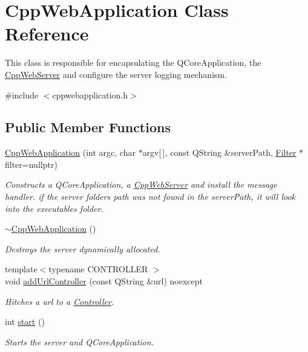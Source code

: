 \hypertarget{class_cpp_web_application}{}\section{Cpp\+Web\+Application Class Reference}
\label{class_cpp_web_application}


This class is responsible for encapsulating the Q\+Core\+Application, the \hyperlink{class_cpp_web_server}{Cpp\+Web\+Server} and configure the server logging mechanism.  




{\ttfamily \#include $<$cppwebapplication.\+h$>$}

\subsection*{Public Member Functions}
\begin{DoxyCompactItemize}
\item 
\hyperlink{class_cpp_web_application_a76766ee1be8080db9db6df98e1b9e907}{Cpp\+Web\+Application} (int argc, char $\ast$argv\mbox{[}$\,$\mbox{]}, const Q\+String \&server\+Path, \hyperlink{class_filter}{Filter} $\ast$filter=nullptr)
\begin{DoxyCompactList}\small\item\em Constructs a Q\+Core\+Application, a \hyperlink{class_cpp_web_server}{Cpp\+Web\+Server} and install the message handler. if the server folder\textquotesingle{}s path was not found in the server\+Path, it will look into the executable\textquotesingle{}s folder. \end{DoxyCompactList}\item 
\mbox{\label{class_cpp_web_application_a96a7655a25d2e35ed545cdb7b8d81cc5}} 
\hyperlink{class_cpp_web_application_a96a7655a25d2e35ed545cdb7b8d81cc5}{$\sim$\+Cpp\+Web\+Application} ()
\begin{DoxyCompactList}\small\item\em Destroys the server dynamically allocated. \end{DoxyCompactList}\item 
{\footnotesize template$<$typename C\+O\+N\+T\+R\+O\+L\+L\+ER $>$ }\\void \hyperlink{class_cpp_web_application_a57657865223a43795ce755e77d7b8f27}{add\+Url\+Controller} (const Q\+String \&url) noexcept
\begin{DoxyCompactList}\small\item\em Hitches a url to a \hyperlink{class_controller}{Controller}. \end{DoxyCompactList}\item 
int \hyperlink{class_cpp_web_application_a1e9f2c789934748d6b7c29ad33e9d7c9}{start} ()
\begin{DoxyCompactList}\small\item\em Starts the server and Q\+Core\+Application. \end{DoxyCompactList}\end{DoxyCompactItemize}


